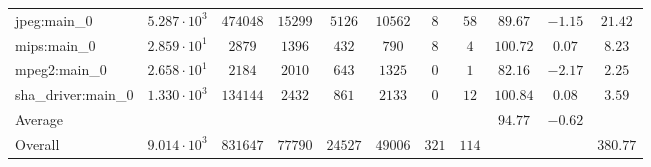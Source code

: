 \begin{tabular}{|l|c|c|c|c|c|c|c|c|c|c|}
jpeg:main\_0            & $ 5.287 \cdot 10^{3} $ & $ 474048 $ & $ 15299 $ & $ 5126  $ & $ 10562 $ & $ 8   $ & $ 58  $ & $ 89.67       $ & $ -1.15   $ & $ 21.42   $ \\
mips:main\_0            & $ 2.859 \cdot 10^{1} $ & $ 2879   $ & $ 1396  $ & $ 432   $ & $ 790   $ & $ 8   $ & $ 4   $ & $ 100.72      $ & $ 0.07    $ & $ 8.23    $ \\
mpeg2:main\_0           & $ 2.658 \cdot 10^{1} $ & $ 2184   $ & $ 2010  $ & $ 643   $ & $ 1325  $ & $ 0   $ & $ 1   $ & $ 82.16       $ & $ -2.17   $ & $ 2.25    $ \\
sha\_driver:main\_0     & $ 1.330 \cdot 10^{3} $ & $ 134144 $ & $ 2432  $ & $ 861   $ & $ 2133  $ & $ 0   $ & $ 12  $ & $ 100.84      $ & $ 0.08    $ & $ 3.59    $ \\
\hline
Average                 & $                    $ & $        $ & $       $ & $       $ & $       $ & $     $ & $     $ & $ 94.77       $ & $ -0.62   $ & $         $ \\
\hline
Overall                 & $ 9.014 \cdot 10^{3} $ & $ 831647 $ & $ 77790 $ & $ 24527 $ & $ 49006 $ & $ 321 $ & $ 114 $ & $             $ & $         $ & $ 380.77  $ \\
\hline
\end{tabular}
